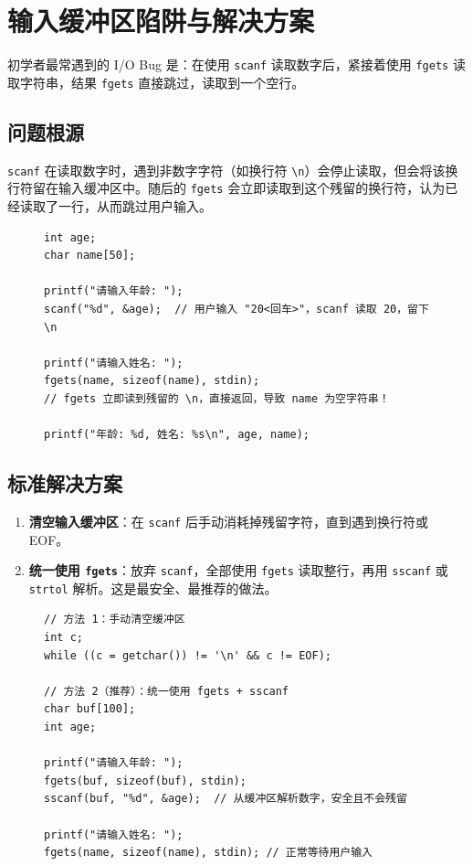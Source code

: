 \section{输入缓冲区陷阱与解决方案}

初学者最常遇到的 I/O Bug 是：在使用 \texttt{scanf} 读取数字后，紧接着使用 \texttt{fgets} 读取字符串，结果 \texttt{fgets} 直接跳过，读取到一个空行。

\subsection{问题根源}

\texttt{scanf} 在读取数字时，遇到非数字字符（如换行符 \texttt{\textbackslash n}）会停止读取，但会将该换行符留在输入缓冲区中。随后的 \texttt{fgets} 会立即读取到这个残留的换行符，认为已经读取了一行，从而跳过用户输入。

\begin{figure}[H]
\centering
\begin{minipage}{0.95\textwidth}
\begin{lstlisting}[caption={输入缓冲区陷阱演示}]
int age;
char name[50];

printf("请输入年龄: ");
scanf("%d", &age);  // 用户输入 "20<回车>"，scanf 读取 20，留下 \n

printf("请输入姓名: ");
fgets(name, sizeof(name), stdin); 
// fgets 立即读到残留的 \n，直接返回，导致 name 为空字符串！

printf("年龄: %d, 姓名: %s\n", age, name);
\end{lstlisting}
\end{minipage}
\end{figure}

\subsection{标准解决方案}

\begin{enumerate}
    \item \textbf{清空输入缓冲区}：在 \texttt{scanf} 后手动消耗掉残留字符，直到遇到换行符或 EOF。
    \item \textbf{统一使用 \texttt{fgets}}：放弃 \texttt{scanf}，全部使用 \texttt{fgets} 读取整行，再用 \texttt{sscanf} 或 \texttt{strtol} 解析。这是最安全、最推荐的做法。
\end{enumerate}

\begin{figure}[H]
\centering
\begin{minipage}{0.95\textwidth}
\begin{lstlisting}[caption={清空缓冲区与统一 fgets 方案}]
// 方法 1：手动清空缓冲区
int c;
while ((c = getchar()) != '\n' && c != EOF);

// 方法 2（推荐）：统一使用 fgets + sscanf
char buf[100];
int age;

printf("请输入年龄: ");
fgets(buf, sizeof(buf), stdin);
sscanf(buf, "%d", &age);  // 从缓冲区解析数字，安全且不会残留

printf("请输入姓名: ");
fgets(name, sizeof(name), stdin); // 正常等待用户输入
\end{lstlisting}
\end{minipage}
\end{figure}
